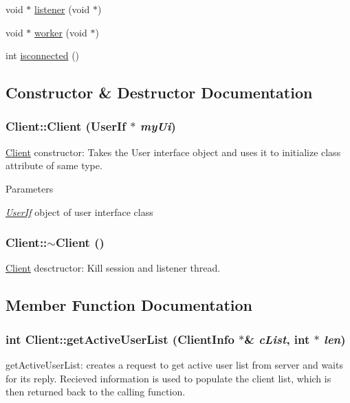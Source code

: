 \begin{DoxyCompactItemize}
\item 
void $\ast$ \hyperlink{classClient_a7b83f2c7c0dfdd9022caab642c5f2d7f}{listener} (void $\ast$)
\item 
void $\ast$ \hyperlink{classClient_a77b4af68238cc619103711603de95cdf}{worker} (void $\ast$)
\item 
int \hyperlink{classClient_ac73e9b5525ca9927ed90e83e9ebe4c15}{isconnected} ()
\end{DoxyCompactItemize}


\subsection{Constructor \& Destructor Documentation}
\hypertarget{classClient_ad636af208cd43a44c112d61c88c7804b}{
\subsubsection[{Client}]{\setlength{\rightskip}{0pt plus 5cm}Client::Client ({\bf UserIf} $\ast$ {\em myUi})}}
\label{classClient_ad636af208cd43a44c112d61c88c7804b}
\hyperlink{classClient}{Client} constructor: Takes the User interface object and uses it to initialize class attribute of same type.


\begin{DoxyParams}{Parameters}
\item[{\em \hyperlink{classUserIf}{UserIf}}]object of user interface class \end{DoxyParams}
\hypertarget{classClient_a840e519ca781888cbd54181572ebe3a7}{
\subsubsection[{$\sim$Client}]{\setlength{\rightskip}{0pt plus 5cm}Client::$\sim$Client ()}}
\label{classClient_a840e519ca781888cbd54181572ebe3a7}
\hyperlink{classClient}{Client} desctructor: Kill session and listener thread. 

\subsection{Member Function Documentation}
\hypertarget{classClient_a63b70c823acca41db31b07630814b8b6}{
\subsubsection[{getActiveUserList}]{\setlength{\rightskip}{0pt plus 5cm}int Client::getActiveUserList ({\bf ClientInfo} $\ast$\& {\em cList}, \/  int $\ast$ {\em len})}}
\label{classClient_a63b70c823acca41db31b07630814b8b6}
getActiveUserList: creates a request to get active user list from server and waits for its reply. Recieved information is used to populate the client list, which is then returned back to the calling function. 

